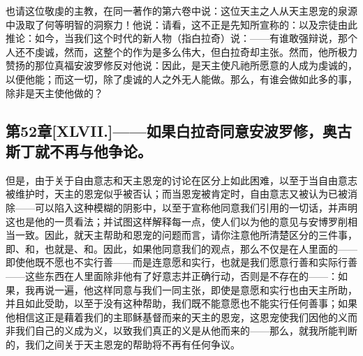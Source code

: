 也请这位敬虔的主教，在同一著作的第六卷中说：这位天主之人从天主恩宠的泉源中汲取了何等明智的洞察力！他说：请看，这不正是先知所宣称的：以及宗徒由此推论：如今，当我们这个时代的新人物（指白拉奇）说：——有谁敢强辩说，那个人还不虔诚，然而，这整个的作为是多么伟大，但白拉奇却主张。然而，他所极力赞扬的那位真福安波罗修反对他说：因此，是天主使凡祂所愿意的人成为虔诚的，以便他能；而这一切，除了虔诚的人之外无人能做。那么，有谁会做如此多的事，除非是天主使他做的？\par


\subsection{第52章[XLVII.]——如果白拉奇同意安波罗修，奥古斯丁就不再与他争论。}

但是，由于关于自由意志和天主恩宠的讨论在区分上如此困难，以至于当自由意志被维护时，天主的恩宠似乎被否认；而当恩宠被肯定时，自由意志又被认为已被消除——可以陷入这种模糊的阴影中，以至于宣称他同意我们引用的一切话，并声明这也是他的一贯看法；并试图这样解释每一点，使人们以为他的意见与安博罗削相当一致。因此，就天主帮助和恩宠的问题而言，请你注意他所清楚区分的三件事，即、和，也就是、和。因此，如果他同意我们的观点，那么不仅是在人里面的——即使他既不愿也不实行善——而是连意愿和实行，也就是我们愿意行善和实际行善——这些东西在人里面除非他有了好意志并正确行动，否则是不存在的——：如果，我再说一遍，他这样同意与我们一同主张，即使是意愿和实行也由天主所助，并且如此受助，以至于没有这种帮助，我们既不能意愿也不能实行任何善事；如果他相信这正是藉着我们的主耶稣基督而来的天主的恩宠，这恩宠使我们因他的义而非我们自己的义成为义，以致我们真正的义是从他而来的——那么，就我所能判断的，我们之间关于天主恩宠的帮助将不再有任何争议。\par


